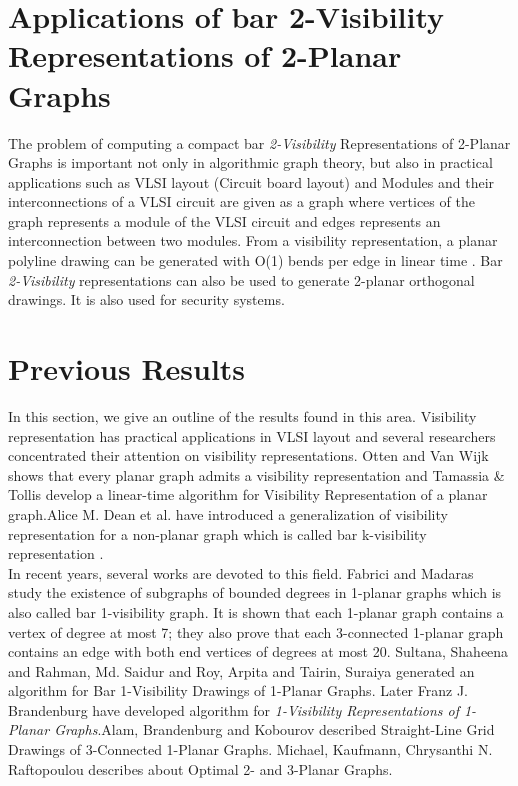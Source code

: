 \section{Applications of bar 2-Visibility Representations of 2-Planar Graphs}
\label{sec:application}

The problem of computing a compact bar \emph{2-Visibility} Representations of 2-Planar Graphs is important not only in algorithmic graph theory, but also in practical applications such as VLSI layout (Circuit board layout) \cite{G} and Modules and their interconnections of a VLSI circuit are given as a graph where vertices of the graph represents a module of the VLSI circuit and edges represents an interconnection between two modules. From a visibility representation, a planar polyline drawing can be generated with O(1) bends per edge in linear time \cite{Nishizeki}. Bar \emph{2-Visibility} representations can also be used to generate 2-planar orthogonal drawings. It is also used for security systems.




\section{Previous Results}
\label{sec:results}
In this section, we give an outline of the results found in this area. Visibility representation has practical applications in VLSI layout \cite{G} and several researchers concentrated their attention on visibility representations. Otten and Van Wijk \cite{Otten} shows that every planar graph admits a visibility representation and Tamassia \& Tollis \cite{R} develop a linear-time algorithm for Visibility Representation of a planar graph.Alice M. Dean et al. have introduced a generalization of visibility representation for a non-planar graph which is called bar k-visibility representation \cite{M}.
\\
In recent years, several works are devoted to this field. Fabrici and Madaras \cite{madaras} study the existence of subgraphs of bounded degrees in 1-planar graphs which is also called bar 1-visibility graph. It is shown that each 1-planar graph contains a vertex of degree at most 7; they also prove that each 3-connected 1-planar graph contains an edge with both end vertices of degrees at most 20. Sultana, Shaheena and Rahman, Md. Saidur and Roy, Arpita and Tairin, Suraiya \cite{sultana} generated an algorithm for Bar 1-Visibility Drawings of 1-Planar Graphs. Later Franz J. Brandenburg \cite{FJ} have developed algorithm for \emph{1-Visibility Representations of 1-Planar Graphs}.Alam, Brandenburg and Kobourov \cite{alam} described Straight-Line Grid Drawings of 3-Connected 1-Planar Graphs. Michael, Kaufmann, Chrysanthi N. Raftopoulou \cite{michael} describes about Optimal 2- and 3-Planar Graphs.




